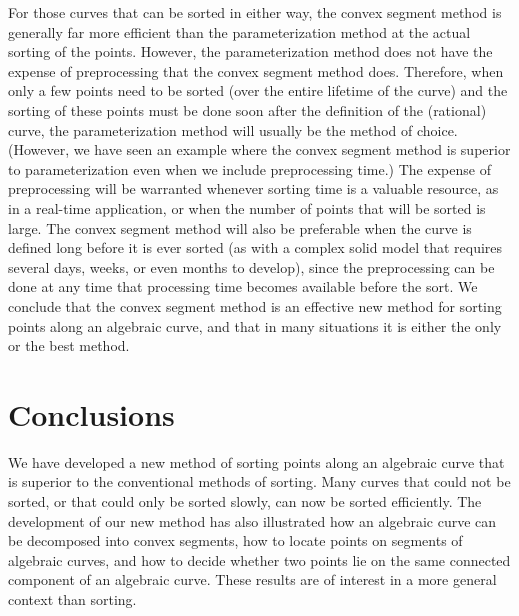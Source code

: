 For those curves that can be sorted in either way, the convex segment method 
is generally far more efficient than the parameterization method at the actual 
sorting of the points.
However, the parameterization method does not have the expense of 
preprocessing that the convex segment method does.
Therefore, when only a few points need to be sorted (over the entire lifetime 
of the curve) and the sorting of these points must be done soon after the 
definition of the (rational) curve, the parameterization method will usually 
be the method of choice.
(However, we have seen an example where the convex segment method is superior
to parameterization even when we include preprocessing time.)
The expense of preprocessing will be warranted whenever sorting time is a 
valuable resource, as in a real-time application, or when the number of points 
that will be sorted is large.
The convex segment method will also be preferable when the curve is defined 
long before it is ever sorted (as with a complex solid model that requires 
several days, weeks, or even months to develop), since the preprocessing can 
be done at any time that processing time becomes available before the sort.
We conclude that the convex segment method is an effective new method for
sorting points along an algebraic curve, and that in many situations it is 
either the only or the best method.

\section{Conclusions}
\label{sco}
We have developed a new method of sorting points along an algebraic curve
that is superior to the conventional methods of sorting.
Many curves that could not be sorted, or that could only be sorted slowly,
can now be sorted efficiently.
The development of our new method has also illustrated how an algebraic curve can 
be decomposed into convex segments, how to locate points on segments 
of algebraic curves, and how to decide whether two points lie on the same
connected component of an algebraic curve.
These results are of interest in a more general context than sorting.

